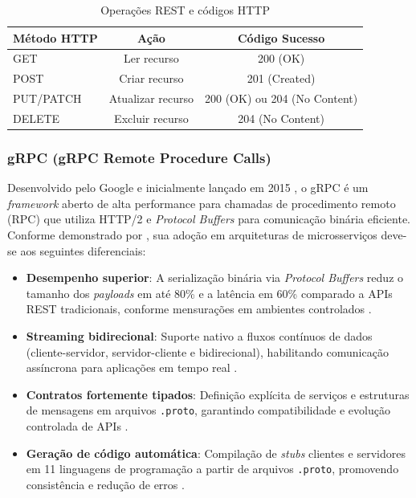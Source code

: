 \begin{table}[h]
\centering
\caption{Operações REST e códigos HTTP}
\label{tab:rest_operations}
\begin{tabular}{|l|c|c|}
\hline
\textbf{Método HTTP} & \textbf{Ação} & \textbf{Código Sucesso} \\ \hline
GET & Ler recurso & 200 (OK) \\ \hline
POST & Criar recurso & 201 (Created) \\ \hline
PUT/PATCH & Atualizar recurso & 200 (OK) ou 204 (No Content) \\ \hline
DELETE & Excluir recurso & 204 (No Content) \\ \hline
\end{tabular}
\end{table}


\subsubsection{\gls{gRPC} (gRPC Remote Procedure Calls)}
Desenvolvido pelo Google e inicialmente lançado em 2015 \cite{googleblog:5}, o \gls{gRPC} é um \textit{framework} aberto de alta performance para chamadas de procedimento remoto (RPC) que utiliza \gls{HTTP/2} e \textit{Protocol Buffers} para comunicação binária eficiente. Conforme demonstrado por \cite{niswar2023performance}, sua adoção em arquiteturas de microsserviços deve-se aos seguintes diferenciais:

\begin{itemize}
\item \textbf{Desempenho superior}: A serialização binária via \textit{Protocol Buffers} reduz o tamanho dos \textit{payloads} em até 80\% e a latência em 60\% comparado a APIs REST tradicionais, conforme mensurações em ambientes controlados \cite{niswar2023performance}.
\item \textbf{Streaming bidirecional}: Suporte nativo a fluxos contínuos de dados (cliente-servidor, servidor-cliente e bidirecional), habilitando comunicação assíncrona para aplicações em tempo real \cite{grpc:1}.
\item \textbf{Contratos fortemente tipados}: Definição explícita de serviços e estruturas de mensagens em arquivos \texttt{.proto}, garantindo compatibilidade e evolução controlada de APIs \cite{maso2024comparativo}.
\item \textbf{Geração de código automática}: Compilação de \textit{stubs} clientes e servidores em 11 linguagens de programação a partir de arquivos \texttt{.proto}, promovendo consistência e redução de erros \cite{grpc:1}.
\end{itemize}

